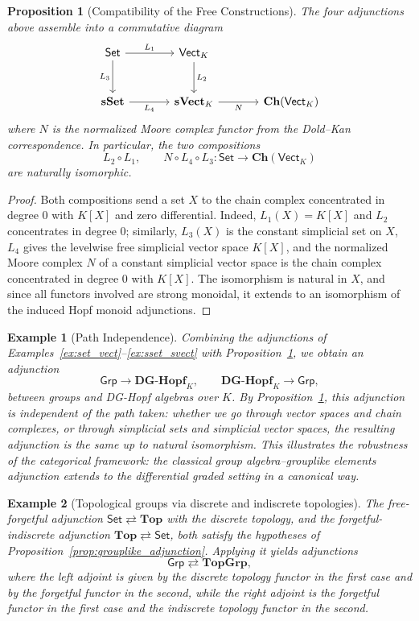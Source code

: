 \documentclass{amsart}
\newcommand{\Set}{\mathsf{Set}}
\newcommand{\Vect}{\mathsf{Vect}}
\newcommand{\Grp}{\mathsf{Grp}}
\newcommand{\VectK}{\Vect_K}
\newtheorem{proposition}{Proposition}[section]
\newtheorem{example}{Example}[section]
\begin{document}
\begin{proposition}[Compatibility of the Free Constructions]\label{prop:commuting_square}
The four adjunctions above assemble into a commutative diagram
\[
\begin{tikzcd}[row sep=large, column sep=large]
\Set \arrow[r, "L_1"] \arrow[d, "L_3"'] & \VectK \arrow[d, "L_2"] \\
\mathbf{sSet} \arrow[r, "L_4"'] & \mathbf{sVect}_K \arrow[r, "N"'] & \mathbf{Ch}(\VectK)
\end{tikzcd}
\]
where $N$ is the normalized Moore complex functor from the Dold--Kan correspondence. In particular, the two compositions
\[
L_2\circ L_1,\qquad N\circ L_4\circ L_3:\Set\longrightarrow\mathbf{Ch}(\VectK)
\]
are naturally isomorphic.
\end{proposition}

\begin{proof}
Both compositions send a set $X$ to the chain complex concentrated in degree $0$ with $K[X]$ and zero differential. Indeed, $L_1(X)=K[X]$ and $L_2$ concentrates in degree $0$; similarly, $L_3(X)$ is the constant simplicial set on $X$, $L_4$ gives the levelwise free simplicial vector space $K[X]$, and the normalized Moore complex $N$ of a constant simplicial vector space is the chain complex concentrated in degree $0$ with $K[X]$. The isomorphism is natural in $X$, and since all functors involved are strong monoidal, it extends to an isomorphism of the induced Hopf monoid adjunctions.
\end{proof}

\begin{example}[Path Independence]\label{ex:path_independence}
Combining the adjunctions of Examples~\ref{ex:set_vect}--\ref{ex:sset_svect} with Proposition~\ref{prop:commuting_square}, we obtain an adjunction
\[
\Grp\longrightarrow\mathbf{DG\text{-}Hopf}_K,\qquad
\mathbf{DG\text{-}Hopf}_K\longrightarrow\Grp,
\]
between groups and DG-Hopf algebras over $K$. By Proposition~\ref{prop:commuting_square}, this adjunction is independent of the path taken: whether we go through vector spaces and chain complexes, or through simplicial sets and simplicial vector spaces, the resulting adjunction is the same up to natural isomorphism. This illustrates the robustness of the categorical framework: the classical group algebra--grouplike elements adjunction extends to the differential graded setting in a canonical way.
\end{example}


\begin{example}[Topological groups via discrete and indiscrete topologies]\label{ex:top_groups}
The free-forgetful adjunction \(\Set \rightleftarrows \mathbf{Top}\) with the discrete topology, and the forgetful-indiscrete adjunction \(\mathbf{Top} \rightleftarrows \Set\), both satisfy the hypotheses of Proposition~\ref{prop:grouplike_adjunction}. Applying it yields adjunctions
\[
\Grp \rightleftarrows \mathbf{TopGrp},
\]
where the left adjoint is given by the discrete topology functor in the first case and by the forgetful functor in the second, while the right adjoint is the forgetful functor in the first case and the indiscrete topology functor in the second.
\end{example}
\end{document}
